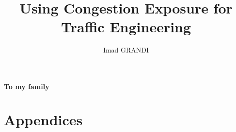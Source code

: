 \documentclass[mres]{ucl_thesis}
\title{Using Congestion Exposure for Traffic Engineering}
\author{Imad GRANDI}
\begin{document}
\maketitle

\clearpage
\clearpage
\fontsize{12}{15}
\selectfont
\begin{center}
\textbf{}
\end{center}
\clearpage
\begin{center}
\textbf{To my family}
\end{center}




\setcounter{tocdepth}{2}
\tableofcontents
\listoffigures

\cleardoublepage

















%


\chapter{Appendices}
%

\end{document}
